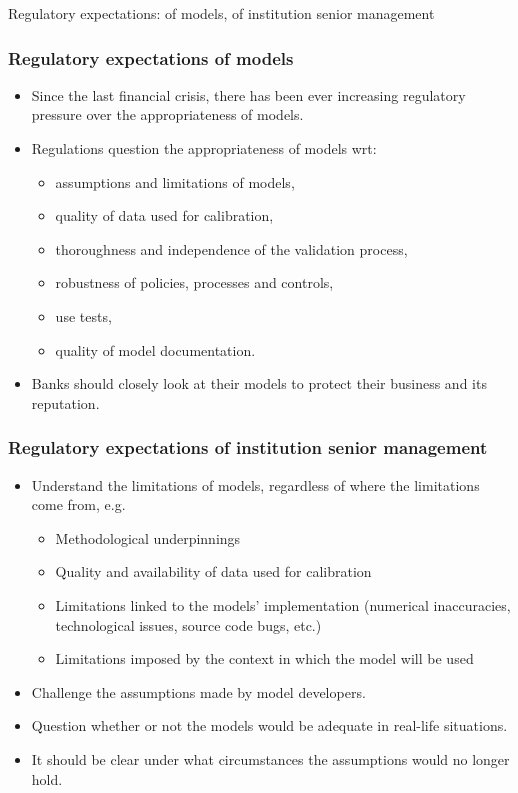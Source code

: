 \documentclass[11pt]{beamer}
\begin{document}
\begin{frame}
\centering
Regulatory expectations: of models, of institution senior management
\end{frame}

\begin{frame}
\frametitle{Regulatory expectations of models}
\begin{itemize}
	\item Since the last financial crisis, there has been ever increasing regulatory pressure over the appropriateness of models. 
	\item Regulations question the appropriateness of models wrt:
	\begin{itemize}
		\item assumptions and limitations of models, 
		\item quality of data used for calibration, 
		\item thoroughness and independence of the validation process,
		\item robustness of policies, processes and controls, 
		\item use tests, 
		\item quality of model documentation.
	\end{itemize}
	\item Banks should closely look at their models to protect their business and its reputation.
\end{itemize}
\end{frame}


\begin{frame}
\frametitle{Regulatory expectations of institution senior management}
\begin{itemize}
	\item Understand the limitations of models, regardless of where the limitations come from, e.g.
	\begin{itemize}
		\item Methodological underpinnings
		\item Quality and availability of data used for calibration
		\item Limitations linked to the models’ implementation (numerical inaccuracies, technological issues, source code bugs, etc.)
		\item Limitations imposed by the context in which the model will be used
	\end{itemize}
	\item Challenge the assumptions made by model developers.
	\item Question whether or not the models would be adequate in real-life situations.
	\item It should be clear under what circumstances the assumptions would no longer hold.
\end{itemize}
\end{frame}
\end{document}
